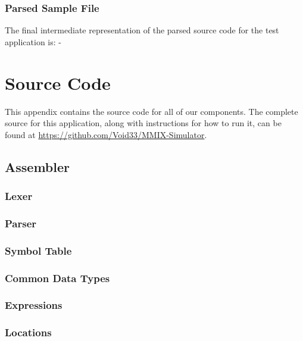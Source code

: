 \documentclass[a4paper,11pt]{report}
\begin{document}
\begin{appendices}
\subsection{Parsed Sample File}
The final intermediate representation of the parsed source code for the test application is: -


\chapter{Source Code}
This appendix contains the source code for all of our components. The complete source for this application, along with instructions for how to run it, can be found at \url{https://github.com/Void33/MMIX-Simulator}.

\section{Assembler}\label{source:assembler}
\subsection{Lexer}\label{source:lexer}

\subsection{Parser}\label{source:parser}

\subsection{Symbol Table}\label{source:SymbolTable}

\subsection{Common Data Types}\label{source:DataTypes}

\subsection{Expressions}\label{source:Expressions}

\subsection{Locations}\label{source:locations}


\end{appendices}
\end{document}
